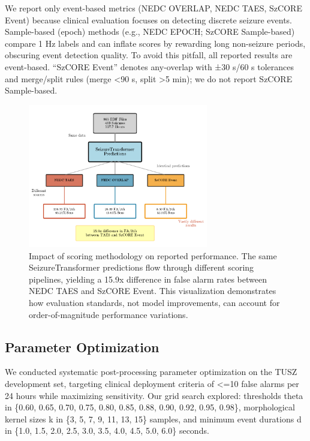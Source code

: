 \documentclass[
]{article}
\begin{document}
We report only event-based metrics (NEDC OVERLAP, NEDC TAES, SzCORE
Event) because clinical evaluation focuses on detecting discrete seizure
events. Sample-based (epoch) methods (e.g., NEDC EPOCH; SzCORE
Sample-based) compare 1 Hz labels and can inflate scores by rewarding
long non-seizure periods, obscuring event detection quality. To avoid
this pitfall, all reported results are event-based. ``SzCORE Event''
denotes any-overlap with ±30 s/60 s tolerances and merge/split rules
(merge \textless90 s, split \textgreater5 min); we do not report SzCORE
Sample-based.

\begin{figure}
\hypertarget{fig:scoring-impact}{%
\centering
\includegraphics[width=0.7\textwidth,height=\textheight]{figures/output/arxiv/FIGURE_2_scoring_impact.pdf}
\caption{Impact of scoring methodology on reported performance. The same
SeizureTransformer predictions flow through different scoring pipelines,
yielding a 15.9x difference in false alarm rates between NEDC TAES and
SzCORE Event. This visualization demonstrates how evaluation standards,
not model improvements, can account for order-of-magnitude performance
variations.}\label{fig:scoring-impact}
}
\end{figure}

\hypertarget{parameter-optimization}{%
\subsection{Parameter Optimization}\label{parameter-optimization}}

We conducted systematic post-processing parameter optimization on the
TUSZ development set, targeting clinical deployment criteria of
\textless=10 false alarms per 24 hours while maximizing sensitivity. Our
grid search explored: thresholds theta in \{0.60, 0.65, 0.70, 0.75,
0.80, 0.85, 0.88, 0.90, 0.92, 0.95, 0.98\}, morphological kernel sizes k
in \{3, 5, 7, 9, 11, 13, 15\} samples, and minimum event durations d in
\{1.0, 1.5, 2.0, 2.5, 3.0, 3.5, 4.0, 4.5, 5.0, 6.0\} seconds.
\end{document}
